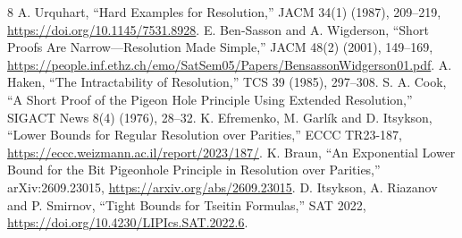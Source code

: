 \documentclass[11pt]{article}
\begin{document}
\begin{thebibliography}{8}
 A. Urquhart, ``Hard Examples for Resolution,'' JACM 34(1) (1987), 209--219, \url{https://doi.org/10.1145/7531.8928}.
 E. Ben-Sasson and A. Wigderson, ``Short Proofs Are Narrow---Resolution Made Simple,'' JACM 48(2) (2001), 149--169, \url{https://people.inf.ethz.ch/emo/SatSem05/Papers/BensassonWidgerson01.pdf}.
 A. Haken, ``The Intractability of Resolution,'' TCS 39 (1985), 297--308.
 S. A. Cook, ``A Short Proof of the Pigeon Hole Principle Using Extended Resolution,'' SIGACT News 8(4) (1976), 28--32.
 K. Efremenko, M. Garl\'ik and D. Itsykson, ``Lower Bounds for Regular Resolution over Parities,'' ECCC TR23-187, \url{https://eccc.weizmann.ac.il/report/2023/187/}.
 K. Braun, ``An Exponential Lower Bound for the Bit Pigeonhole Principle in Resolution over Parities,'' arXiv:2609.23015, \url{https://arxiv.org/abs/2609.23015}.
 D. Itsykson, A. Riazanov and P. Smirnov, ``Tight Bounds for Tseitin Formulas,'' SAT 2022, \url{https://doi.org/10.4230/LIPIcs.SAT.2022.6}.
\end{thebibliography}
\end{document}
